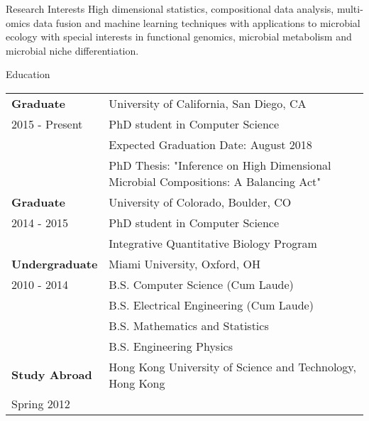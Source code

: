 \documentclass{resume} %
\begin{document}

\begin{rSection}{Research Interests}
  High dimensional statistics, compositional data analysis, multi-omics data fusion and machine learning techniques with applications to microbial ecology with special interests in functional genomics, microbial metabolism and microbial niche differentiation.
\end{rSection}
\begin{rSection}{Education}
  \begin{tabular}{ll}
    \textbf{Graduate}    & University of California, San Diego, CA  \\
    2015 - Present  & PhD student in Computer Science \\
                    & Expected Graduation Date: August 2018\\
                    & PhD Thesis: "Inference on High Dimensional Microbial Compositions: A Balancing Act"\\
    \textbf{Graduate}    & University of Colorado, Boulder, CO \\
    2014 - 2015  & PhD student in Computer Science \\
                    & Integrative Quantitative Biology Program \\
    \textbf{Undergraduate}    & Miami University, Oxford, OH \\
    2010 - 2014   & B.S. Computer Science (Cum Laude)\\
    & B.S. Electrical Engineering (Cum Laude)\\
    & B.S. Mathematics and Statistics \\
    & B.S. Engineering Physics \\
    \textbf{Study Abroad} &  Hong Kong University of Science and Technology, Hong Kong   \\
    Spring 2012 \\
  \end{tabular}
\end{rSection}
\end{document}
